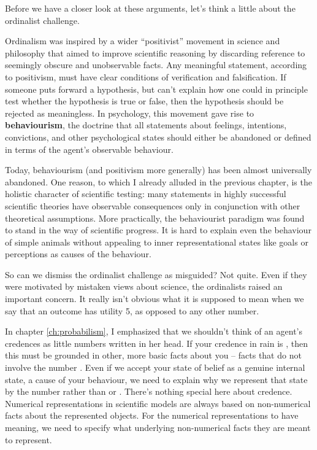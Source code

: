 Before we have a closer look at these arguments, let's think a
little about the ordinalist challenge.

Ordinalism was inspired by a wider ``positivist'' movement in science
and philosophy that aimed to improve scientific reasoning by
discarding reference to seemingly obscure and unobservable facts. Any
meaningful statement, according to positivism, must have clear
conditions of verification and falsification. If someone puts
forward a hypothesis, but can't explain how one could in principle
test whether the hypothesis is true or false, then the hypothesis
should be rejected as meaningless.  In psychology, this movement gave
rise to \textbf{behaviourism}, the doctrine that all statements about
feelings, intentions, convictions, and other psychological states
should either be abandoned or defined in terms of the agent's
observable behaviour.

Today, behaviourism (and positivism more generally) has been almost
universally abandoned.  One reason, to which I already alluded in the
previous chapter, is the holistic character of scientific testing:
many statements in highly successful scientific theories have
observable consequences only in conjunction with other theoretical
assumptions.%
%
More practically, the behaviourist paradigm was found to stand in the
way of scientific progress. It is hard to explain even the behaviour
of simple animals without appealing to inner representational states
like goals or perceptions as causes of the behaviour.

So can we dismiss the ordinalist challenge as misguided? Not
quite. Even if they were motivated by mistaken views about science,
the ordinalists raised an important concern. It really isn't obvious
what it is supposed to mean when we say that an outcome has utility 5,
as opposed to any other number.

In chapter \ref{ch:probabilism}, I emphasized that we shouldn't think
of an agent's credences as little numbers written in her head. If your
credence in rain is , then this must be grounded in
other, more basic facts about you -- facts that do not involve the
number . Even if we accept your state of belief as a
genuine internal state, a cause of your behaviour, we need to explain
why we represent that state by the number  rather than
 or . There's nothing special here
about credence. Numerical representations in scientific models are
always based on non-numerical facts about the represented
objects. For the numerical representations to have meaning, we need to
specify what underlying non-numerical facts they are meant to represent.

